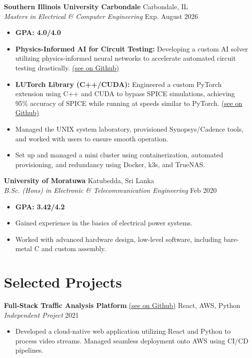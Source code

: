 \documentclass[letterpaper,10pt]{article}
\begin{document}
\noindent \textbf{Southern Illinois University Carbondale} \hfill Carbondale, IL \\
\textit{Masters in Electrical \& Computer Engineering} \hfill Exp. August 2026
\begin{itemize}
    \item \textbf{GPA: 4.0/4.0}
    \item \textbf{Physics-Informed AI for Circuit Testing:} Developing a custom AI solver utilizing physics-informed neural networks to accelerate automated circuit testing drastically. \href{https://github.com/Jester-2-6/s-imply}{(see on Github)}
    \item \textbf{LUTorch Library (C++/CUDA):} Engineered a custom PyTorch extension using C++ and CUDA to bypass SPICE simulations, achieving 95\% accuracy of SPICE while running at speeds similar to PyTorch. \href{https://github.com/Jester-2-6/LUTorch}{(see on Github)}
    \item Managed the UNIX system laboratory, provisioned Synopsys/Cadence tools, and worked with users to ensure smooth operation.
    \item Set up and managed a mini cluster using containerization, automated provisioning, and redundancy using Docker, k3s, and TrueNAS.
\end{itemize}

\noindent \textbf{University of Moratuwa} \hfill Katubedda, Sri Lanka \\
\textit{B.Sc. (Hons) in Electronic \& Telecommunication Engineering} \hfill Feb 2020
\begin{itemize}
    \item \textbf{GPA: 3.42/4.2}
    \item Gained experience in the basics of electrical power systems.
    \item Worked with advanced hardware design, low-level software, including bare-metal C and custom assembly.
\end{itemize}

\section{Selected Projects}

\noindent \textbf{Full-Stack Traffic Analysis Platform} \href{https://github.com/abrutech/vision-traffic}{(see on Github)} \hfill React, AWS, Python \\
\textit{Independent Project} \hfill 2021
\begin{itemize}
    \item Developed a cloud-native web application utilizing React and Python to process video streams. Managed seamless deployment onto AWS using CI/CD pipelines.
\end{itemize}
\end{document}

